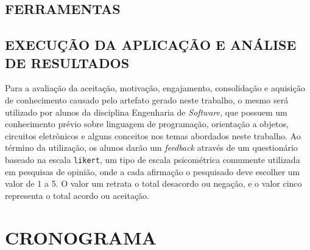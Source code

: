 \section{FERRAMENTAS}
\label{sec:ferramentas}

\section{EXECUÇÃO DA APLICAÇÃO E ANÁLISE DE RESULTADOS}
\label{sec:execAppAnaliseResultados}
Para a avaliação da aceitação, motivação, engajamento, consolidação e aquisição de conhecimento causado pelo artefato gerado neste trabalho, o mesmo será utilizado por alunos da disciplina Engenharia de \textit{Software}, que possuem um conhecimento prévio sobre linguagem de programação, orientação a objetos, circuitos eletrônicos e alguns conceitos nos temas abordados neste trabalho. Ao término da utilização, os alunos darão um \textit{feedback} através de um questionário baseado na escala \texttt{likert}, um tipo de escala psicométrica comumente utilizada em pesquisas de opinião, onde a cada afirmação o pesquisado deve escolher um valor de 1 a 5. O valor um retrata o total desacordo ou negação, e o valor cinco representa o total acordo ou aceitação.


\chapter{CRONOGRAMA}
\label{chap:cronograma}